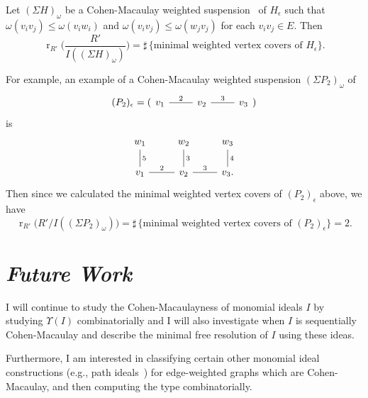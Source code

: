 \documentclass{article}
\begin{document}
\begin{theorem} \label{weightedCMTypeEqualToMinWVCTheorem}
    Let $(\Sigma H)_\omega$ be a Cohen-Macaulay weighted suspension~\cite{MR3055580} of $H_\epsilon$ such that $\omega(v_iv_j) \leq \omega(v_iw_i)$ and $\omega(v_iv_j) \leq \omega(w_jv_j)$ for each $v_iv_j \in E$. Then
    \[\operatorname{r}_{R'}\biggl(\frac{R'}{I((\Sigma H)_\omega)}\biggr) = \sharp\, \{\text{minimal weighted vertex covers of }H_\epsilon\}.\]
\end{theorem}

    For example, an example of a Cohen-Macaulay weighted suspension $(\Sigma P_2)_\omega$ of 
    \[(P_2)_\epsilon = (\begin{tikzcd}v_1 \ar[r,dash,"2"] & v_2 \ar[r,dash,"3"] & v_3\end{tikzcd})\]
    is 
    \[
        \begin{tikzcd}
            w_1 \ar[d,dash,"5"] & w_2 \ar[d,dash,"3"] & w_3 \ar[d,dash,"4"] \\
            v_1 \ar[r,dash,"2"] & v_2 \ar[r,dash,"3"] & v_3.
        \end{tikzcd}
    \]
    Then since we calculated the minimal weighted vertex covers of $(P_2)_\epsilon$ above, we have
    \[\operatorname{r}_{R'}\bigl(R'/I((\Sigma P_2)_\omega)\bigr) = \sharp\, \{\text{minimal weighted vertex covers of }(P_2)_\epsilon\} = 2.\]

\section{\textsl{\large Future Work}}

I will continue to study the Cohen-Macaulayness of monomial ideals $I$ by studying $\Upsilon(I)$ combinatorially and I will also investigate when $I$ is sequentially Cohen-Macaulay and describe the minimal free resolution of $I$ using these ideas. 

Furthermore, I am interested in classifying certain other monomial ideal constructions (e.g., path ideals~\cite{MR3175038,MR3335988}) for edge-weighted graphs which are Cohen-Macaulay, and then computing the type combinatorially. \par

 

\end{document}
